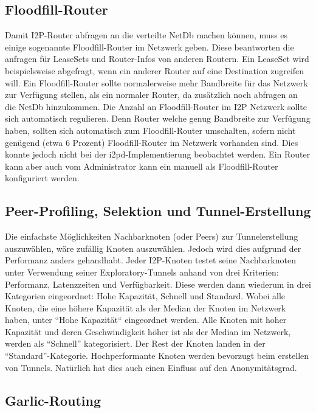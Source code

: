 \subsection{Floodfill-Router}

Damit I2P-Router abfragen an die verteilte NetDb machen können, muss es einige sogenannte Floodfill-Router im Netzwerk geben.
Diese beantworten die anfragen für LeaseSets und Router-Infos von anderen Routern.
Ein LeaseSet wird beispielsweise abgefragt, wenn ein anderer Router auf eine Destination zugreifen will.
Ein Floodfill-Router sollte normalerweise mehr Bandbreite für das Netzwerk zur Verfügung stellen, als ein normaler Router, da zusätzlich noch abfragen an die NetDb hinzukommen.
Die Anzahl an Floodfill-Router im I2P Netzwerk sollte sich automatisch regulieren.
Denn Router welche genug Bandbreite zur Verfügung haben, sollten sich automatisch zum Floodfill-Router umschalten, sofern nicht genügend (etwa 6 Prozent) Floodfill-Router im Netzwerk vorhanden sind.
Dies konnte jedoch nicht bei der i2pd-Implementierung beobachtet werden.
Ein Router kann aber auch vom Administrator kann ein manuell als Floodfill-Router konfiguriert werden.
\parencite[S.~5-6]{timpanaro_monitoring_2011}

\subsection{Peer-Profiling, Selektion und Tunnel-Erstellung}\label{sec:tunnelerstellung}

Die einfachste Möglichkeiten Nachbarknoten (oder Peers) zur Tunnelerstellung auszuwählen, wäre zufällig Knoten auszuwählen.
Jedoch wird dies aufgrund der Performanz anders gehandhabt.
Jeder I2P-Knoten testet seine Nachbarknoten unter Verwendung seiner Exploratory-Tunnels anhand von drei Kriterien:
Performanz, Latenzzeiten und Verfügbarkeit.
Diese werden dann wiederum in drei Kategorien eingeordnet: Hohe Kapazität, Schnell und Standard.
Wobei alle Knoten, die eine höhere Kapazität als der Median der Knoten im Netzwerk haben, unter ``Hohe Kapazität`` eingeordnet werden.
Alle Knoten mit hoher Kapazität und deren Geschwindigkeit höher ist als der Median im Netzwerk, werden als ``Schnell'' kategorisiert. Der Rest der Knoten landen in der ``Standard''-Kategorie.
Hochperformante Knoten werden bevorzugt beim erstellen von Tunnels.
Natürlich hat dies auch einen Einfluss auf den Anonymitätsgrad.
\parencites[S.~4-5]{timpanaro_monitoring_2011}[S. 3]{liu_empirical_2014}

\subsection{Garlic-Routing}\label{sec:garlic_routing}

